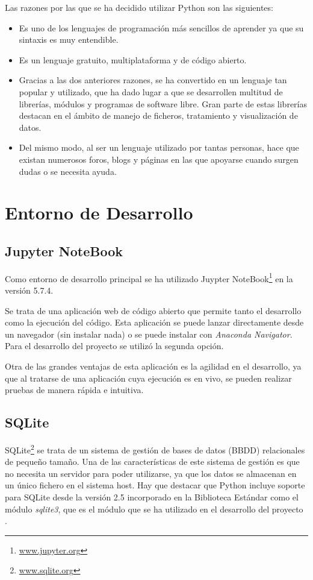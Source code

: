 Las razones por las que se ha decidido utilizar Python son las siguientes:
\begin{itemize}
	\item Es uno de los lenguajes de programación más sencillos de aprender ya que su sintaxis es muy entendible.
	\item Es un lenguaje gratuito, multiplataforma y de código abierto.
	\item Gracias a las dos anteriores razones, se ha convertido en un lenguaje tan popular y utilizado, que ha dado lugar a que se desarrollen multitud de librerías, módulos y programas de software libre. Gran parte de estas librerías destacan en el ámbito de manejo de ficheros, tratamiento y visualización de datos.
	\item Del mismo modo, al ser un lenguaje utilizado por tantas personas, hace que existan numerosos foros, blogs y páginas en las que apoyarse cuando surgen dudas o se necesita ayuda.
\end{itemize}


\section{Entorno de Desarrollo}\label{entorno_de_desarrollo}
\subsection{Jupyter NoteBook}\label{jupyter_noteBook}
Como entorno de desarrollo principal se ha utilizado Juypter NoteBook\footnote{\href {https://jupyter.org/}{www.jupyter.org}} en la versión 5.7.4.

Se trata de una aplicación web de código abierto que permite tanto el desarrollo como la ejecución del código.
Esta aplicación se puede lanzar directamente desde un navegador (sin instalar nada) o se puede instalar con \emph{Anaconda Navigator}. Para el desarrollo del proyecto se utilizó la segunda opción.

Otra de las grandes ventajas de esta aplicación es la agilidad en el desarrollo, ya que al tratarse de una aplicación cuya ejecución es en vivo, se pueden realizar pruebas de manera rápida e intuitiva. 


\subsection{SQLite}\label{sqlite}
SQLite\footnote{\href {https://www.sqlite.org/index.html}{www.sqlite.org}} se trata de un sistema de gestión de bases de datos (BBDD) relacionales de pequeño tamaño.
Una de las características de este sistema de gestión es que no necesita un servidor para poder utilizarse, ya que los datos se almacenan en un único fichero en el sistema host. 
Hay que destacar que Python incluye soporte para SQLite desde la versión 2.5 incorporado en la Biblioteca Estándar como el módulo \emph{sqlite3}, que es el módulo que se ha utilizado en el desarrollo del proyecto \cite{sqlite}.



